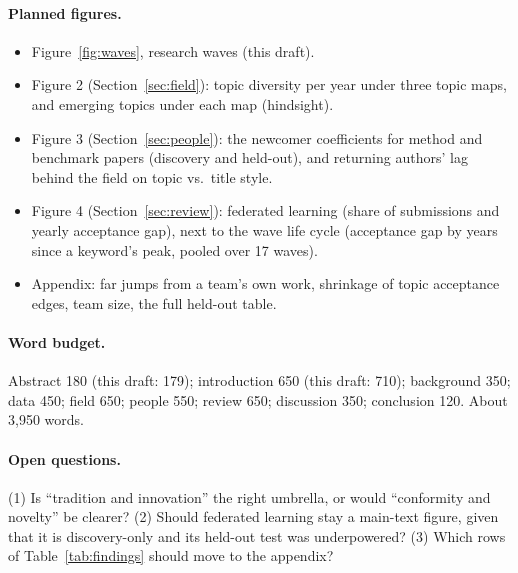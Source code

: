 \documentclass[11pt]{article}
\begin{document}
\paragraph{Planned figures.}
\begin{itemize}
  \item Figure~\ref{fig:waves}, research waves (this draft).
  \item Figure 2 (Section~\ref{sec:field}): topic diversity per year under three topic maps, and emerging topics
    under each map (hindsight).
  \item Figure 3 (Section~\ref{sec:people}): the newcomer coefficients for method and benchmark papers (discovery and
    held-out), and returning authors' lag behind the field on topic vs.\ title style.
  \item Figure 4 (Section~\ref{sec:review}): federated learning (share of submissions and yearly acceptance gap), next
    to the wave life cycle (acceptance gap by years since a keyword's peak, pooled over 17 waves).
  \item Appendix: far jumps from a team's own work, shrinkage of topic acceptance edges, team size, the full held-out
    table.
\end{itemize}

\paragraph{Word budget.} Abstract 180 (this draft: 179); introduction 650 (this draft: 710); background 350; data 450; field 650; people
550; review 650; discussion 350; conclusion 120. About 3,950 words.

\paragraph{Open questions.} (1) Is ``tradition and innovation'' the right umbrella, or would ``conformity and
novelty'' be clearer? (2) Should federated learning stay a main-text figure, given that it is discovery-only and its
held-out test was underpowered? (3) Which rows of Table~\ref{tab:findings} should move to the appendix?
\end{document}
